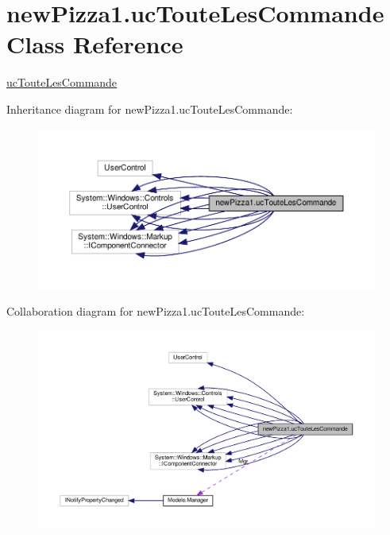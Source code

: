 \hypertarget{classnewPizza1_1_1ucTouteLesCommande}{}\section{new\+Pizza1.\+uc\+Toute\+Les\+Commande Class Reference}
\label{classnewPizza1_1_1ucTouteLesCommande}


\hyperlink{classnewPizza1_1_1ucTouteLesCommande}{uc\+Toute\+Les\+Commande}  




Inheritance diagram for new\+Pizza1.\+uc\+Toute\+Les\+Commande\+:
\nopagebreak
\begin{figure}[H]
\begin{center}
\leavevmode
\includegraphics[width=350pt]{classnewPizza1_1_1ucTouteLesCommande__inherit__graph}
\end{center}
\end{figure}


Collaboration diagram for new\+Pizza1.\+uc\+Toute\+Les\+Commande\+:
\nopagebreak
\begin{figure}[H]
\begin{center}
\leavevmode
\includegraphics[width=350pt]{classnewPizza1_1_1ucTouteLesCommande__coll__graph}
\end{center}
\end{figure}
